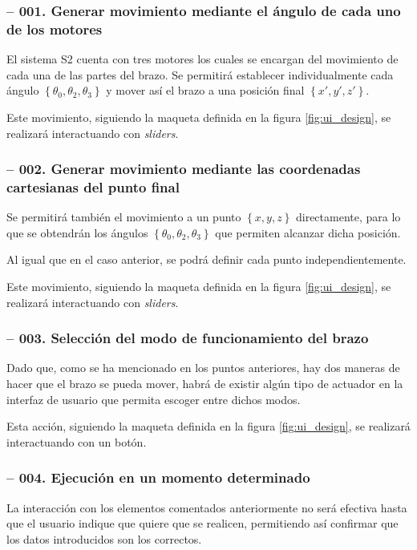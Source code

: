 \subsubsection*{ -- 001. Generar movimiento mediante el ángulo de cada uno de los motores}

El sistema \ac{S2} cuenta con tres motores los cuales se encargan del movimiento de cada una de las partes del
brazo. Se permitirá establecer individualmente cada ángulo $\left\{\theta_0, \theta_2, \theta_3\right\}$ 
y mover así el brazo a una posición final $\left\{x', y', z'\right\}$.

Este movimiento, siguiendo la maqueta definida en la figura \ref{fig:ui_design}, se realizará interactuando
con \textit{sliders}.

\subsubsection*{ -- 002. Generar movimiento mediante las coordenadas cartesianas del punto final}
Se permitirá también el movimiento a un punto $\left\{x, y, z\right\}$ directamente, para lo que se obtendrán
los ángulos $\left\{\theta_0, \theta_2, \theta_3\right\}$ que permiten alcanzar dicha posición.

Al igual que en el caso anterior, se podrá definir cada punto independientemente.

Este movimiento, siguiendo la maqueta definida en la figura \ref{fig:ui_design}, se realizará interactuando
con \textit{sliders}.

\subsubsection*{ -- 003. Selección del modo de funcionamiento del brazo}
Dado que, como se ha mencionado en los puntos anteriores, hay dos maneras de hacer que el brazo se pueda
mover, habrá de existir algún tipo de actuador en la interfaz de usuario que permita escoger entre dichos modos.

Esta acción, siguiendo la maqueta definida en la figura \ref{fig:ui_design}, se realizará interactuando con
un botón.

\subsubsection*{ -- 004. Ejecución en un momento determinado}
La interacción con los elementos comentados anteriormente no será efectiva hasta que el usuario indique que
quiere que se realicen, permitiendo así confirmar que los datos introducidos son los correctos.

